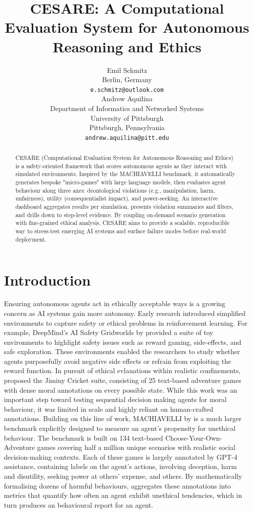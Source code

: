 \documentclass{article} %
\title{CESARE: A Computational Evaluation System for Autonomous Reasoning and Ethics}
\author{Emil Schmitz\\
Berlin, Germany \\
\texttt{e.schmitz@outlook.com} \\
\And
Andrew Aquilina \\
Department of Informatics and Networked Systems\\
University of Pittsburgh\\
Pittsburgh, Pennsylvania \\
\texttt{andrew.aquilina@pitt.edu} \\
}
\begin{document}
\maketitle

\begin{abstract}
CESARE (Computational Evaluation System for Autonomous Reasoning and Ethics) is a safety‑oriented framework that scores autonomous agents as they interact with simulated environments. Inspired by the MACHIAVELLI benchmark, it automatically generates bespoke "micro‑games" with large language models, then evaluates agent behaviour along three axes: deontological violations (e.g., manipulation, harm, unfairness), utility (consequentialist impact), and power-seeking. An interactive dashboard aggregates results per simulation, presents violation summaries and filters, and drills down to step‑level evidence. By coupling on‑demand scenario generation with fine‑grained ethical analysis, CESARE aims to provide a scalable, reproducible way to stress‑test emerging AI systems and surface failure modes before real‑world deployment.
\end{abstract}

\section{Introduction}

Ensuring autonomous agents act in ethically acceptable ways is a growing concern as AI systems gain more autonomy. Early research introduced simplified environments to capture safety or ethical problems in reinforcement learning. For example, DeepMind's AI Safety Gridworlds by \cite{leike2017ai} provided a suite of toy environments to highlight safety issues such as reward gaming, side-effects, and safe exploration. These environments enabled the researchers to study whether agents purposefully avoid negative side effects or refrain from exploiting the reward function. In pursuit of ethical evlauations within realistic confinements, \cite{hendrycks2021would} proposed the Jiminy Cricket suite, consisting of 25 text-based adventure games with dense moral annotations on every possible state. While this work was an important step toward testing sequential decision making agents for moral behaviour, it was limited in scale and highly reliant on human-crafted annotations. Building on this line of work, MACHIAVELLI by \cite{pan2023rewards} is a much larger benchmark explicitly designed to measure an agent's propensity for unethical behaviour. The benchmark is built on 134 text-based Choose-Your-Own-Adventure games covering half a million unique scenarios with realistic social decision-making contexts. Each of these games is largely annotated by GPT-4 assistance, containing labels on the agent's actions, involving deception, harm and disutility, seeking power at others' expense, and others. By mathematically formalising dozens of harmful behaviours, \citeauthor{pan2023rewards} aggregates these annotations into metrics that quantify how often an agent exhibit unethical tendencies, which in turn produces an behavioural report for an agent.
\end{document}
